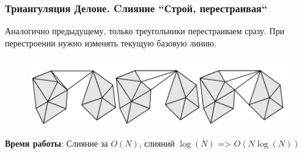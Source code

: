 \documentclass[notheorems,aspectratio=169]{beamer}
\begin{document}
\begin{frame}\frametitle{Триангуляция Делоне. Cлияние ``Строй, перестраивая``}
	Аналогично предыдущему, только треугольники перестраиваем сразу. 
	При перестроении нужно изменять текущую базовую линию. 
	\begin{figure}
		\includegraphics[height=0.5\textheight, keepaspectratio]{c.png}
	\end{figure}
	\textbf{Время работы}: Слияние за $O(N)$, слияний $\log(N)$ => $O(N\log(N))$
	
\end{frame}
\end{document}
